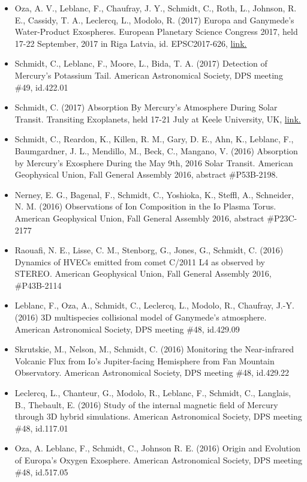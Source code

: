 \documentclass[12pt]{report}
\begin{document}
\begin{itemize}
   \item Oza, A. V., Leblanc, F., Chaufray, J. Y., Schmidt, C., Roth, L., Johnson, R. E., Cassidy, T. A., Leclercq, L., Modolo, R. (2017) Europa and Ganymede's Water-Product Exospheres. European Planetary Science Congress 2017, held 17-22 September, 2017 in Riga Latvia, id. EPSC2017-626, \href{https://meetingorganizer.copernicus.org/EPSC2017/EPSC2017-626-1.pdf}{link.} 
   \item Schmidt, C., Leblanc, F., Moore, L., Bida, T. A. (2017) Detection of Mercury's Potassium Tail. American Astronomical Society, DPS meeting \#49, id.422.01
   \item Schmidt, C. (2017) Absorption By Mercury's Atmosphere During Solar Transit. Transiting Exoplanets, held 17-21 July at Keele University, UK, \href{https://wasp-planets.net/conference/talk-abstracts/#44}{link.} 
   \item Schmidt, C., Reardon, K., Killen, R. M., Gary, D. E., Ahn, K., Leblanc, F., Baumgardner, J. L., Mendillo, M., Beck, C., Mangano, V. (2016) Absorption by Mercury's Exosphere During the May 9th, 2016 Solar Transit. American Geophysical Union, Fall General Assembly 2016, abstract \#P53B-2198.
   \item Nerney, E. G., Bagenal, F., Schmidt, C., Yoshioka, K., Steffl, A., Schneider, N. M. (2016) Observations of Ion Composition in the Io Plasma Torus. American Geophysical Union, Fall General Assembly 2016, abstract \#P23C-2177
   \item Raouafi, N. E., Lisse, C. M., Stenborg, G., Jones, G., Schmidt, C. (2016) Dynamics of HVECs emitted from comet C/2011 L4 as observed by STEREO. American Geophysical Union, Fall General Assembly 2016, \#P43B-2114
   \item Leblanc, F., Oza, A., Schmidt, C., Leclercq, L., Modolo, R., Chaufray, J.-Y. (2016) 3D multispecies collisional model of Ganymede's atmosphere. American Astronomical Society, DPS meeting \#48, id.429.09
   \item Skrutskie, M., Nelson, M., Schmidt, C. (2016) Monitoring the Near-infrared Volcanic Flux from Io's Jupiter-facing Hemisphere from Fan Mountain Observatory. American Astronomical Society, DPS meeting \#48, id.429.22
   \item Leclercq, L., Chanteur, G., Modolo, R., Leblanc, F., Schmidt, C., Langlais, B., Thebault, E. (2016) Study of the internal magnetic field of Mercury through 3D hybrid simulations. American Astronomical Society, DPS meeting \#48, id.117.01
   \item Oza, A. Leblanc, F., Schmidt, C., Johnson R. E. (2016) Origin and Evolution of Europa's Oxygen Exosphere. American Astronomical Society, DPS meeting \#48, id.517.05

\end{itemize}
\end{document}
